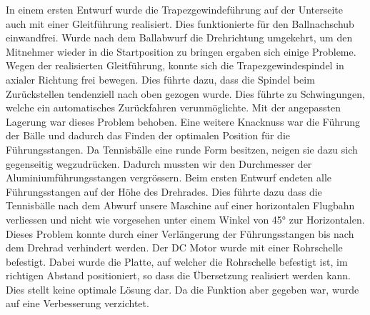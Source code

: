 In einem ersten Entwurf wurde die Trapezgewindeführung auf der Unterseite auch mit einer Gleitführung realisiert. Dies funktionierte für den Ballnachschub einwandfrei. Wurde nach dem Ballabwurf die Drehrichtung umgekehrt, um den Mitnehmer wieder in die Startposition zu bringen ergaben sich einige Probleme. Wegen der realisierten Gleitführung, konnte sich die Trapezgewindespindel in axialer Richtung frei bewegen. Dies führte dazu, dass die Spindel beim Zurückstellen tendenziell nach oben gezogen wurde. Dies führte zu Schwingungen, welche ein automatisches Zurückfahren verunmöglichte. Mit der angepassten Lagerung war dieses Problem behoben. 
Eine weitere Knacknuss war die Führung der Bälle und dadurch das Finden der optimalen Position für die Führungsstangen. Da Tennisbälle eine runde Form besitzen, neigen sie dazu sich gegenseitig wegzudrücken. Dadurch mussten wir den Durchmesser der Aluminiumführungsstangen vergrössern. Beim ersten Entwurf endeten alle Führungsstangen auf der Höhe des Drehrades. Dies führte dazu dass die Tennisbälle nach dem Abwurf unsere Maschine auf einer horizontalen Flugbahn verliessen und nicht wie vorgesehen unter einem Winkel von 45° zur Horizontalen. Dieses Problem konnte durch einer Verlängerung der Führungsstangen bis nach dem Drehrad verhindert werden. 
Der DC Motor wurde mit einer Rohrschelle befestigt. Dabei wurde die Platte, auf welcher die Rohrschelle befestigt ist, im richtigen Abstand positioniert, so dass die Übersetzung realisiert werden kann. Dies stellt keine optimale Lösung dar. Da die Funktion aber gegeben war, wurde auf eine Verbesserung verzichtet. 
